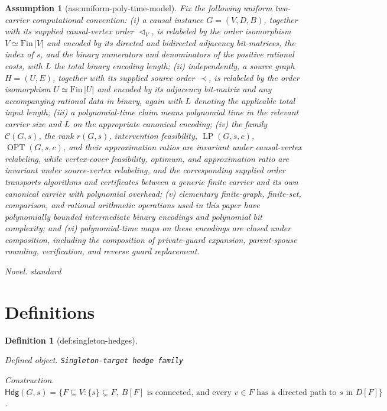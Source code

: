 \documentclass{article}
\newtheorem{assumption}{Assumption}
\newtheorem{definition}{Definition}
\begin{document}
\begin{assumption}[ass:uniform-poly-time-model]\label{ass:uniform-poly-time-model}
Fix the following uniform two-carrier computational convention: (i) a
causal instance \(G=(V,D,B)\), together with its supplied causal-vertex
order \(\triangleleft_V\), is relabeled by the order isomorphism
\(V\simeq\mathrm{Fin}\,|V|\) and encoded by its directed and bidirected
adjacency bit-matrices, the index of \(s\), and the binary numerators and
denominators of the positive rational costs, with \(L\) the total binary
encoding length; (ii) independently, a source graph \(H=(U,E)\), together
with its supplied source order \(\prec\), is relabeled by the order
isomorphism \(U\simeq\mathrm{Fin}\,|U|\) and encoded by its adjacency
bit-matrix and any accompanying rational data in binary, again with \(L\)
denoting the applicable total input length; (iii) a polynomial-time claim
means polynomial time in the relevant carrier size and \(L\) on the
appropriate canonical encoding; (iv) the family \(\mathcal C(G,s)\), the
rank \(r(G,s)\), intervention feasibility, \(\operatorname{LP}(G,s,c)\),
\(\operatorname{OPT}(G,s,c)\), and their approximation ratios are invariant
under causal-vertex relabeling, while vertex-cover feasibility, optimum, and
approximation ratio are invariant under source-vertex relabeling, and the
corresponding supplied order transports algorithms and certificates between
a generic finite carrier and its own canonical carrier with polynomial
overhead; (v) elementary finite-graph, finite-set, comparison, and rational
arithmetic operations used in this paper have polynomially bounded
intermediate binary encodings and polynomial bit complexity; and (vi)
polynomial-time maps on these encodings are closed under composition,
including the composition of private-guard expansion, parent-spouse rounding,
verification, and reverse guard replacement.
\par\smallskip\noindent\emph{Novel.} standard
\end{assumption}

\section{Definitions}

\begin{definition}[def:singleton-hedges]\label{def:singleton-hedges}
\par\smallskip\noindent\emph{Defined object.} \texttt{Singleton-\allowbreak{}target hedge family}
\par\smallskip\noindent\emph{Construction.} \(\mathsf{Hdg}(G,s)=\{F\subseteq V:\{s\}\subsetneq F,\ B[F]\text{ is connected, and every }v\in F\text{ has a directed path to }s\text{ in }D[F]\}\).
\end{definition}
\end{document}
